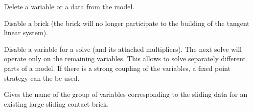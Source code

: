 \documentclass[a4paper,11pt,english]{sphinxmanual}
\begin{document}
\begin{fulllineitems}
\begin{fulllineitems}
\end{fulllineitems}


\begin{fulllineitems}
\label{\detokenize{python/cmdref_Model:getfem.Model.delete_variable}}
Delete a variable or a data from the model.

\end{fulllineitems}


\begin{fulllineitems}
\label{\detokenize{python/cmdref_Model:getfem.Model.disable_bricks}}
Disable a brick (the brick will no longer participate to the
building of the tangent linear system).

\end{fulllineitems}


\begin{fulllineitems}
\label{\detokenize{python/cmdref_Model:getfem.Model.disable_variable}}
Disable a variable for a solve (and its attached multipliers).
The next solve will operate only on
the remaining variables. This allows to solve separately different
parts of a model. If there is a strong coupling of the variables,
a fixed point strategy can the be used.

\end{fulllineitems}


\begin{fulllineitems}
\label{\detokenize{python/cmdref_Model:getfem.Model.displacement_group_name_of_Nitsche_large_sliding_contact_brick}}
Gives the name of the group of variables corresponding to the
sliding data for an existing large sliding contact brick.


\end{fulllineitems}
\end{fulllineitems}
\end{document}
